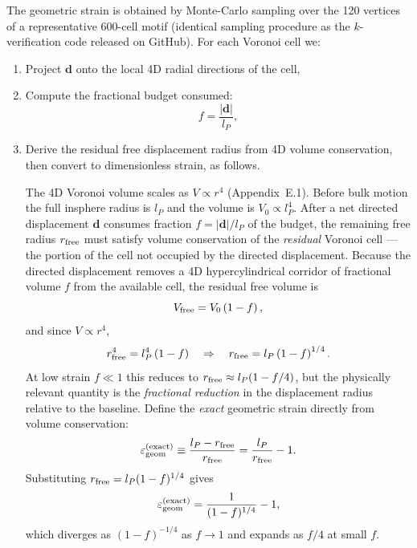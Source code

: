 \documentclass[11pt,letterpaper]{article}
\begin{document}
The geometric strain is obtained by Monte-Carlo sampling over the 120 vertices 
of a representative 600-cell motif (identical sampling procedure as the 
\(k\)-verification code released on GitHub). For each Voronoi cell we:

\begin{enumerate}
\item Project \(\mathbf{d}\) onto the local 4D radial directions of the cell,
\item Compute the fractional budget consumed:
\[
f = \frac{|\mathbf{d}|}{l_P},
\]
\item Derive the residual free displacement radius from 4D volume conservation, 
then convert to dimensionless strain, as follows.

The 4D Voronoi volume scales as $V \propto r^4$ (Appendix~E.1). Before bulk 
motion the full insphere radius is $l_P$ and the volume is $V_0 \propto l_P^4$. 
After a net directed displacement $\mathbf{d}$ consumes fraction $f = |\mathbf{d}|/l_P$ 
of the budget, the remaining free radius $r_{\rm free}$ must satisfy volume 
conservation of the \emph{residual} Voronoi cell — the portion of the cell not 
occupied by the directed displacement. Because the directed displacement removes 
a 4D hypercylindrical corridor of fractional volume $f$ from the available cell, 
the residual free volume is
\[
V_{\rm free} = V_0 \left(1 - f\right),
\]
and since $V \propto r^4$,
\[
r_{\rm free}^4 = l_P^4\left(1-f\right) \quad \Rightarrow \quad 
r_{\rm free} = l_P\left(1-f\right)^{1/4}.
\]
At low strain $f \ll 1$ this reduces to $r_{\rm free} \approx l_P(1 - f/4)$, 
but the physically relevant quantity is the \emph{fractional reduction} in the 
displacement radius relative to the baseline. Define the \emph{exact} 
geometric strain directly from volume conservation:
\begin{equation}
\varepsilon_{\rm geom}^{\rm (exact)} \equiv \frac{l_P - r_{\rm free}}{r_{\rm free}} 
= \frac{l_P}{r_{\rm free}} - 1.
\label{eq:eps_exact_def}
\end{equation}
Substituting $r_{\rm free} = l_P(1-f)^{1/4}$ gives
\begin{equation}
\varepsilon_{\rm geom}^{\rm (exact)} = \frac{1}{(1-f)^{1/4}} - 1,
\label{eq:eps_exact}
\end{equation}
which diverges as $(1-f)^{-1/4}$ as $f \to 1$ and expands as $f/4$ at 
small $f$.


\end{enumerate}
\end{document}
